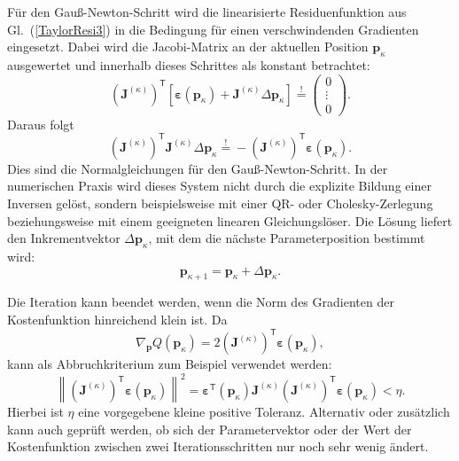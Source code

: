 Für den Gauß-Newton-Schritt wird die linearisierte Residuenfunktion aus
Gl.~(\ref{TaylorResi3}) in die Bedingung für einen verschwindenden Gradienten eingesetzt.
Dabei wird die Jacobi-Matrix an der aktuellen Position $\mathbf{p}_\kappa$ ausgewertet und
innerhalb dieses Schrittes als konstant betrachtet:
\begin{equation}
\left(\boldsymbol{J}^{(\kappa)}\right)^\mathsf{T}
\left[
\boldsymbol{\varepsilon}(\mathbf{p}_\kappa)
+
\boldsymbol{J}^{(\kappa)}
\Delta \mathbf{p}_\kappa
\right]
\overset{!}{=}
\left(\begin{array}{c}
0 \\
\vdots \\
0
\end{array}\right).
\label{GradientQlinGl1}
\end{equation}
Daraus folgt
\begin{equation}
\left(\boldsymbol{J}^{(\kappa)}\right)^\mathsf{T}
\boldsymbol{J}^{(\kappa)}
\Delta \mathbf{p}_\kappa
\overset{!}{=}
-
\left(\boldsymbol{J}^{(\kappa)}\right)^\mathsf{T}
\boldsymbol{\varepsilon}(\mathbf{p}_\kappa).
\label{GradientQlinGl3}
\end{equation}
Dies sind die Normalgleichungen für den Gauß-Newton-Schritt. In der numerischen Praxis
wird dieses System nicht durch die explizite Bildung einer Inversen gelöst, sondern
beispielsweise mit einer QR- oder Cholesky-Zerlegung beziehungsweise mit einem
geeigneten linearen Gleichungslöser. Die Lösung liefert den Inkrementvektor
$\Delta \mathbf{p}_\kappa$, mit dem die nächste
Parameterposition bestimmt wird:
\begin{equation}
\mathbf{p}_{\kappa+1}
=
\mathbf{p}_{\kappa}
+
\Delta \mathbf{p}_{\kappa}.
\end{equation}

Die Iteration kann beendet werden, wenn die Norm des Gradienten der Kostenfunktion hinreichend
klein ist. Da
\begin{equation}
\nabla_{\mathbf{p}} Q(\mathbf{p}_\kappa)
=
2
\left(\boldsymbol{J}^{(\kappa)}\right)^\mathsf{T}
\boldsymbol{\varepsilon}(\mathbf{p}_\kappa),
\end{equation}
kann als Abbruchkriterium zum Beispiel verwendet werden:
\begin{equation}
\left\|
\left(\boldsymbol{J}^{(\kappa)}\right)^\mathsf{T}
\boldsymbol{\varepsilon}(\mathbf{p}_\kappa)
\right\|^2
=
\boldsymbol{\varepsilon}^\mathsf{T}(\mathbf{p}_\kappa)
\boldsymbol{J}^{(\kappa)}
\left(\boldsymbol{J}^{(\kappa)}\right)^\mathsf{T}
\boldsymbol{\varepsilon}(\mathbf{p}_\kappa)
<
\eta .
\label{AbbruchGradient}
\end{equation}
Hierbei ist $\eta$ eine vorgegebene kleine positive Toleranz. Alternativ oder zusätzlich kann
auch geprüft werden, ob sich der Parametervektor oder der Wert der Kostenfunktion zwischen zwei
Iterationsschritten nur noch sehr wenig ändert.

